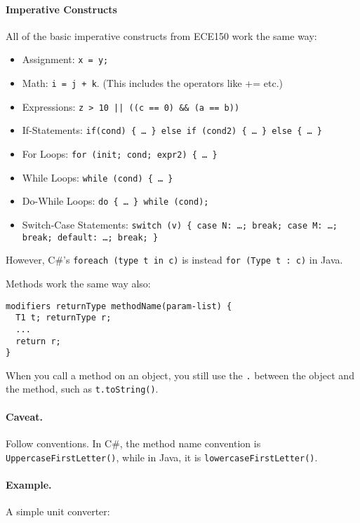 \paragraph{Imperative Constructs}
All of the basic imperative constructs from ECE150 work the same way:
\begin{itemize}
\item Assignment: {\tt x = y;}
\item Math: {\tt i = j + k}. (This includes the operators like += etc.)
\item Expressions: {\tt z > 10 || ((c == 0) \&\& (a == b))}
\item If-Statements: {\tt if(cond) \{ \ldots~\} else if (cond2) \{ \ldots~\}  else  \{ \ldots~\} }
\item For Loops: {\tt for (init; cond; expr2) \{ \ldots~\} }
\item While Loops: {\tt while (cond) \{ \ldots~\} }
\item Do-While Loops: {\tt do \{ \ldots~\} while (cond); }
\item Switch-Case Statements: {\tt switch (v) \{ case N: \ldots; break; case M: \ldots; break; default: \ldots; break; \} }
\end{itemize}
However, C\#'s {\tt foreach (type t in c)} is instead {\tt for (Type t : c)} in Java.

Methods work the same way also:
\begin{verbatim}
modifiers returnType methodName(param-list) {
  T1 t; returnType r;
  ...
  return r;
}
\end{verbatim}

When you call a method on an object, you still use the \texttt{.} between the object and the method, such as \texttt{t.toString()}.

\paragraph{Caveat.} Follow conventions. In C\#, the method name convention is
{\tt UppercaseFirstLetter()}, while in Java, it is {\tt lowercaseFirstLetter()}.

\paragraph{Example.} A simple unit converter:


